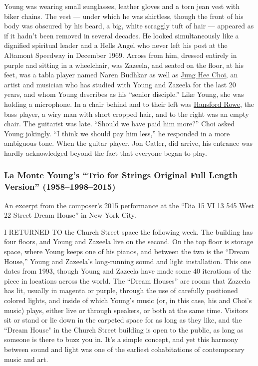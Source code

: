 Young was wearing small sunglasses, leather gloves and a torn jean vest
with biker chains. The vest --- under which he was shirtless, though the
front of his body was obscured by his beard, a big, white scraggly tuft
of hair --- appeared as if it hadn't been removed in several decades. He
looked simultaneously like a dignified spiritual leader and a Hells
Angel who never left his post at the Altamont Speedway in December 1969.
Across from him, dressed entirely in purple and sitting in a wheelchair,
was Zazeela, and seated on the floor, at his feet, was a tabla player
named Naren Budhkar as well as \href{http://jungheechoi.com/}{Jung Hee
Choi}, an artist and musician who has studied with Young and Zazeela for
the last 20 years, and whom Young describes as his ``senior disciple.''
Like Young, she was holding a microphone. In a chair behind and to their
left was \href{https://www.hansfordrowe.com/}{Hansford Rowe}, the bass
player, a wiry man with short cropped hair, and to the right was an
empty chair. The guitarist was late. ``Should we have paid him more?''
Choi asked Young jokingly. ``I think we should pay him less,'' he
responded in a more ambiguous tone. When the guitar player, Jon Catler,
did arrive, his entrance was hardly acknowledged beyond the fact that
everyone began to play.

\hypertarget{la-monte-youngs-trio-for-strings-original-full-length-version-195819982015}{%
\subsubsection{La Monte Young's ``Trio for Strings Original Full Length
Version''
(1958--1998--2015)}\label{la-monte-youngs-trio-for-strings-original-full-length-version-195819982015}}

An excerpt from the composer's 2015 performance at the ``Dia 15 VI 13
545 West 22 Street Dream House'' in New York City.

I RETURNED TO the Church Street space the following week. The building
has four floors, and Young and Zazeela live on the second. On the top
floor is storage space, where Young keeps one of his pianos, and between
the two is the ``Dream House,'' Young and Zazeela's long-running sound
and light installation. This one dates from 1993, though Young and
Zazeela have made some 40 iterations of the piece in locations across
the world. The ``Dream Houses'' are rooms that Zazeela has lit, usually
in magenta or purple, through the use of carefully positioned colored
lights, and inside of which Young's music (or, in this case, his and
Choi's music) plays, either live or through speakers, or both at the
same time. Visitors sit or stand or lie down in the carpeted space for
as long as they like, and the ``Dream House" in the Church Street
building is open to the public, as long as someone is there to buzz you
in. It's a simple concept, and yet this harmony between sound and light
was one of the earliest cohabitations of contemporary music and art.

